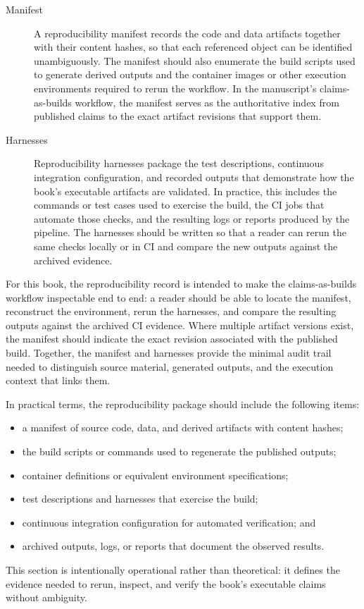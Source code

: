 \begin{description}
  \item[Manifest] A reproducibility manifest records the code and data artifacts together with their content hashes, so that each referenced object can be identified unambiguously. The manifest should also enumerate the build scripts used to generate derived outputs and the container images or other execution environments required to rerun the workflow. In the manuscript's claims-as-builds workflow, the manifest serves as the authoritative index from published claims to the exact artifact revisions that support them.

  \item[Harnesses] Reproducibility harnesses package the test descriptions, continuous integration configuration, and recorded outputs that demonstrate how the book's executable artifacts are validated. In practice, this includes the commands or test cases used to exercise the build, the CI jobs that automate those checks, and the resulting logs or reports produced by the pipeline. The harnesses should be written so that a reader can rerun the same checks locally or in CI and compare the new outputs against the archived evidence.
\end{description}

For this book, the reproducibility record is intended to make the claims-as-builds workflow inspectable end to end: a reader should be able to locate the manifest, reconstruct the environment, rerun the harnesses, and compare the resulting outputs against the archived CI evidence. Where multiple artifact versions exist, the manifest should indicate the exact revision associated with the published build. Together, the manifest and harnesses provide the minimal audit trail needed to distinguish source material, generated outputs, and the execution context that links them.

In practical terms, the reproducibility package should include the following items:
\begin{itemize}
  \item a manifest of source code, data, and derived artifacts with content hashes;
  \item the build scripts or commands used to regenerate the published outputs;
  \item container definitions or equivalent environment specifications;
  \item test descriptions and harnesses that exercise the build;
  \item continuous integration configuration for automated verification; and
  \item archived outputs, logs, or reports that document the observed results.
\end{itemize}

This section is intentionally operational rather than theoretical: it defines the evidence needed to rerun, inspect, and verify the book's executable claims without ambiguity.

